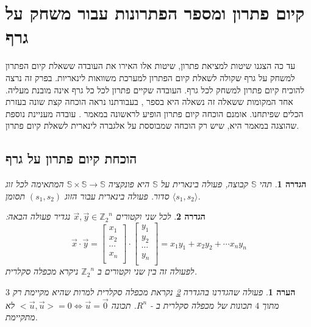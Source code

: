 \documentclass[12pt,leqno]{article}
\theoremstyle{theoremdd}
\newtheorem{definition}{הגדרה}[section]
\newtheorem{comm}{הערה}[section]
\newcommand{\Zn}{{\mathbb{Z}_2}^n}
\begin{document}
\section{קיום פתרון ומספר הפתרונות עבור משחק על גרף}
עד כה הצגנו שיטות למציאת פתרון,
שיטות אלו האירו את העובדה
ששאלת קיום הפתרון למשחק על גרף שקולה לשאלת קיום הפתרון למערכת
משוואות לינאריות.
בפרק זה נרצה להוכיח קיום פתרון למשחק לכל גרף.
העובדה שקיים פתרון לכל כל גרף אינה מובנת מעליה.
אחד המקומות ששאלה זה נשאלה היא בספר 
\cite{B3},
בעבודתנו נראה הוכחה קצת שונה בעזרת הכלים שפיתחנו.
אומנם הוכחה קיום פתרון הופיע לראשונה במאמר 
\cite{Sutner}.
עובדה מעניינת נוספת שהוצגה במאמר היא,
שיש רק הוכחה שמבוססת על אלגברה לינארית
לשאלת קיום פתרון.

\subsection{הוכחת קיום פתרון על גרף}
\begin{definition}
    תהי 
    $\mathbb{S}$
    קבוצה,
    פעולה בינארית על 
    $\mathbb{S}$
    היא פונקציה
    $\mathbb{S} \times \mathbb{S} \rightarrow \mathbb{S}$
    המתאימה לכל זוג 
    סדור.
    פעולה בינארית 
    עבור הזוג
    $(s_1, s_2)$
    תסומן
    $\langle s_1, s_2 \rangle$.
\end{definition}
\begin{definition}
    \label{def:inner_mul}
    לכל שני וקטורים
    $\vec x, \vec y \in \Zn$
    נגדיר פעולה הבאה:
    \begin{equation}
        \vec x \cdot \vec y = 
        \begin{bmatrix}
            x_1 \\
            x_2 \\
            \cdots \\
            x_n \\
        \end{bmatrix}
        \cdot 
        \begin{bmatrix}
            y_1 \\
            y_2 \\
            \cdots \\
            y_n \\
        \end{bmatrix}
        = 
        x_1 y_1 + x_2 y_2 + \cdots x_n y_n
    \end{equation}
    לפעולה זה
    בין שני וקטורים ב
    $\Zn$
    ניקרא מכפלה סקלרית. 
\end{definition}
\begin{comm}
    \label{comm:not_really_inner_mul}
    פעולה שהגדרנו 
    בהגדרה 
    \ref{def:inner_mul}
    נקראת 
    מכפלה סקלרית
    למרות שהיא
    מקיימת רק 
    $3$
    מתוך 
    $4$
    תכונות של מכפלה סקלרית ב
    -
    $R^n$.   
    תכונה 
    $<\vec{u},\vec{u}> = 0 \Leftrightarrow \vec{u} = \vec{0} $
    לא מתקיימת.
\end{comm}
\end{document}
